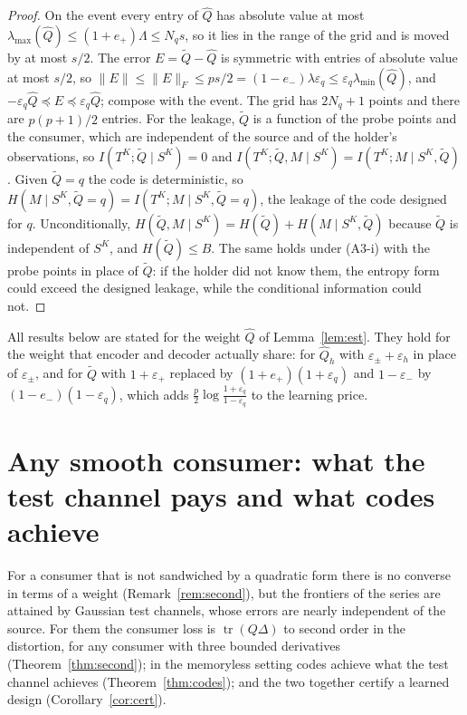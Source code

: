 \documentclass[11pt,onecolumn]{IEEEtran}
\newcommand{\tr}{\operatorname{tr}}
\newcommand{\epp}{\varepsilon_{+}}
\newcommand{\emm}{\varepsilon_{-}}
\newcommand{\lmin}{\lambda_{\min}}
\newcommand{\lmax}{\lambda_{\max}}
\begin{document}
\begin{proof}
On the event every entry of $\hat Q$ has absolute value at most
$\lmax(\hat Q)\le(1+e_+)\Lambda\le N_qs$, so it lies in the range of the grid and is
moved by at most $s/2$. The error $E=\tilde Q-\hat Q$ is symmetric with entries of
absolute value at most $s/2$, so $\|E\|\le\|E\|_F\le ps/2=(1-e_-)\lambda\varepsilon_q
\le\varepsilon_q\lmin(\hat Q)$, and $-\varepsilon_q\hat Q\preceq E\preceq\varepsilon_q\hat Q$;
compose with the event. The grid has $2N_q+1$ points and there are $p(p+1)/2$ entries.
For the leakage, $\tilde Q$ is a function of the probe points and the consumer, which
are independent of the source and of the holder's observations, so
$I(T^K;\tilde Q\mid S^K)=0$ and $I(T^K;\tilde Q,M\mid S^K)=I(T^K;M\mid S^K,\tilde Q)$. Given
$\tilde Q=q$ the code is deterministic, so $H(M\mid S^K,\tilde Q=q)=I(T^K;M\mid S^K,\tilde Q=q)$,
the leakage of the code designed for $q$. Unconditionally,
$H(\tilde Q,M\mid S^K)=H(\tilde Q)+H(M\mid S^K,\tilde Q)$ because $\tilde Q$ is independent of
$S^K$, and $H(\tilde Q)\le B$. The same holds under (A3-i) with the probe points in place
of $\tilde Q$: if the holder did not know them, the entropy form could exceed the
designed leakage, while the conditional information could not.
\end{proof}

All results below are stated for the weight $\hat Q$ of Lemma~\ref{lem:est}. They hold
for the weight that encoder and decoder actually share: for $\hat Q_h$ with
$\varepsilon_\pm+\varepsilon_h$ in place of $\varepsilon_\pm$, and for $\tilde Q$ with
$1+\epp$ replaced by $(1+e_+)(1+\varepsilon_q)$ and $1-\emm$ by $(1-e_-)(1-\varepsilon_q)$,
which adds $\tfrac p2\log\frac{1+\varepsilon_q}{1-\varepsilon_q}$ to the learning price.

\section{Any smooth consumer: what the test channel pays and what codes achieve}

For a consumer that is not sandwiched by a quadratic form there is no converse in terms
of a weight (Remark~\ref{rem:second}), but the frontiers of the series are attained by
Gaussian test channels, whose errors are nearly independent of the source. For them
the consumer loss is $\tr(Q\Delta)$ to second order in the distortion, for any consumer
with three bounded derivatives (Theorem~\ref{thm:second}); in the memoryless setting
codes achieve what the test channel achieves (Theorem~\ref{thm:codes}); and the two
together certify a learned design (Corollary~\ref{cor:cert}).
\end{document}

